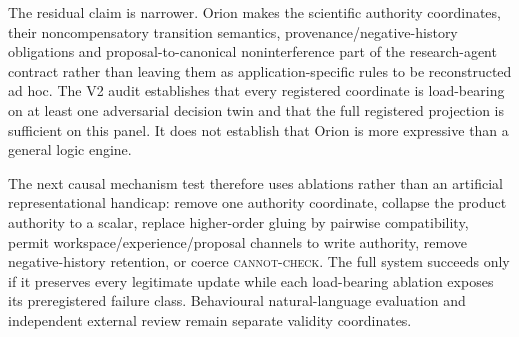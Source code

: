 The residual claim is narrower. Orion makes the scientific authority coordinates, their noncompensatory transition semantics, provenance/negative-history obligations and proposal-to-canonical noninterference part of the research-agent contract rather than leaving them as application-specific rules to be reconstructed ad hoc. The V2 audit establishes that every registered coordinate is load-bearing on at least one adversarial decision twin and that the full registered projection is sufficient on this panel. It does not establish that Orion is more expressive than a general logic engine.

The next causal mechanism test therefore uses ablations rather than an artificial representational handicap: remove one authority coordinate, collapse the product authority to a scalar, replace higher-order gluing by pairwise compatibility, permit workspace/experience/proposal channels to write authority, remove negative-history retention, or coerce \textsc{cannot-check}. The full system succeeds only if it preserves every legitimate update while each load-bearing ablation exposes its preregistered failure class. Behavioural natural-language evaluation and independent external review remain separate validity coordinates.
